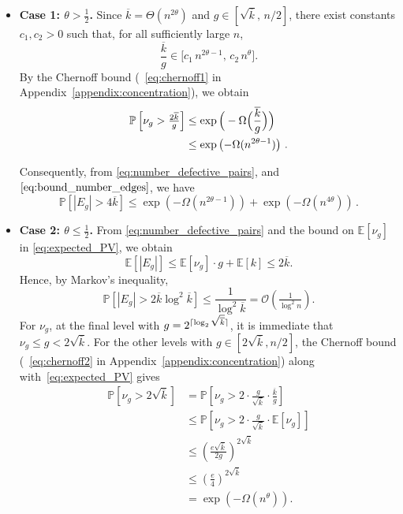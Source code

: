 \documentclass[journal]{IEEEtran}
\theoremstyle{definition}
\theoremstyle{definition}
\newcommand{\EE}{\mathbb{E}}
\newcommand{\PP}{\mathbb{P}}
\newcommand{\PV}{\nu}
\newcommand{\kb}{\overline{k}}
\DeclarePairedDelimiter\ceil{\lceil}{\rceil}
\newcommand{\bigO}{\mathcal{O}}
\begin{document}
\begin{itemize}
    \item {
\textbf{Case 1: $\theta > \tfrac{1}{2}$.}
Since $\kb=\Theta(n^{2\theta})$ and $g\in[\sqrt{\kb},\,n/2]$, there exist constants $c_1,c_2>0$ such that, for all sufficiently large $n$,
\[
  \frac{\kb}{g}\in\big[c_1\,n^{2\theta-1},\,c_2\,n^{\theta}\big].
\]
By the Chernoff bound (~\eqref{eq:chernoff1} in Appendix~\ref{appendix:concentration}), we obtain
\begin{align}
    \PP \left[\PV_g>\tfrac{2\kb}{g}\right]
    &\le \exp \Big(- \Omega \Big(\frac{\kb}{g} \Big)\Big) \notag \\
    &\le \exp \left(-\Omega(n^{2\theta-1}) \right)\, .
    \label{eq:PV_g_theta_1}
\end{align}

Consequently, from \eqref{eq:number_defective_pairs}, and $\eqref{eq:bound_number_edges}$, we have
\[
  \PP[|E_g| > 4\kb] \leq \exp \left( -\Omega(n^{2\theta-1}) \right) + \exp \left( - \Omega(n^{4\theta}) \right) \, .
\]
    }
    \item{
    \textbf{Case 2: $\theta \leq \tfrac{1}{2}$.}  
From \eqref{eq:number_defective_pairs} and the bound on $\EE[\PV_g]$ in \eqref{eq:expected_PV}, we obtain
\[
  \EE[|E_g|] \leq \EE[\PV_g]\cdot g + \EE[k] \leq 2\kb.
\]
Hence, by Markov’s inequality,
\[
  \PP[|E_g| > 2\kb\log^2 \kb] \leq \frac{1}{\log^2 \kb} = \bigO \left(\tfrac{1}{\log^2 n}\right).
\]
For $\PV_g$, at the final level with $g=2^{\ceil{\log_2 \sqrt{\kb}}}$, it is immediate that $\PV_g \leq g < 2\sqrt{\kb}$.  
For the other levels with $g \in [2\sqrt{\kb}, n/2]$, the Chernoff bound (~\eqref{eq:chernoff2} in Appendix~\ref{appendix:concentration}) along with~\eqref{eq:expected_PV} gives
\begin{align}
\PP \left[\PV_g > 2\sqrt{\kb}\right]
  &= \PP \left[\PV_g > 2\cdot \frac{g}{\sqrt{\kb}} \cdot \frac{\kb}{g}\right] \nonumber \\
  &\leq \PP \left[\PV_g > 2\cdot \frac{g}{\sqrt{\kb}} \cdot \EE[\PV_g]\right] \nonumber \\
  &\leq \left(\frac{e\sqrt{\kb}}{2g}\right)^{2\sqrt{\kb}}  \nonumber \\
  &\leq \left(\frac{e}{4}\right)^{2\sqrt{\kb}} \nonumber \\
  &= \exp \left(-\Omega(n^{\theta})\right). \label{eq:PV_g_theta_2}
\end{align}
    }
\end{itemize}
\end{document}
